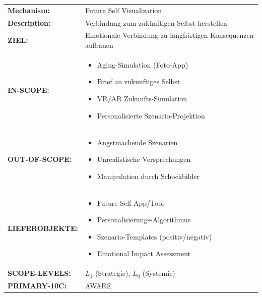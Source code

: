 \begin{tcolorbox}[colback=gray!5!white, colframe=gray!75!black,
    title=\textbf{EIT-EMP-3-D4-EX: Example Specification --- Future Self Visualization}]

\begin{tabular}{@{}p{3cm}p{10cm}@{}}
\textbf{Mechanism:} & Future Self Visualization \\
\textbf{Description:} & Verbindung zum zukünftigen Selbst herstellen \\
\midrule
\textbf{ZIEL:} & Emotionale Verbindung zu langfristigen Konsequenzen aufbauen \\
\midrule
\textbf{IN-SCOPE:} &
\begin{itemize}[nosep,leftmargin=*]
    \item Aging-Simulation (Foto-App)
    \item Brief an zukünftiges Selbst
    \item VR/AR Zukunfts-Simulation
    \item Personalisierte Szenario-Projektion
\end{itemize} \\
\midrule
\textbf{OUT-OF-SCOPE:} &
\begin{itemize}[nosep,leftmargin=*]
    \item[$\times$] Angstmachende Szenarien
    \item[$\times$] Unrealistische Versprechungen
    \item[$\times$] Manipulation durch Schockbilder
\end{itemize} \\
\midrule
\textbf{LIEFEROBJEKTE:} &
\begin{itemize}[nosep,leftmargin=*]
    \item[$\square$] Future Self App/Tool
    \item[$\square$] Personalisierungs-Algorithmus
    \item[$\square$] Szenario-Templates (positiv/negativ)
    \item[$\square$] Emotional Impact Assessment
\end{itemize} \\
\midrule
\textbf{SCOPE-LEVELS:} & $L_1$ (Strategic), $L_0$ (Systemic) \\
\textbf{PRIMARY-10C:} & AWARE \\
\end{tabular}

\end{tcolorbox}

